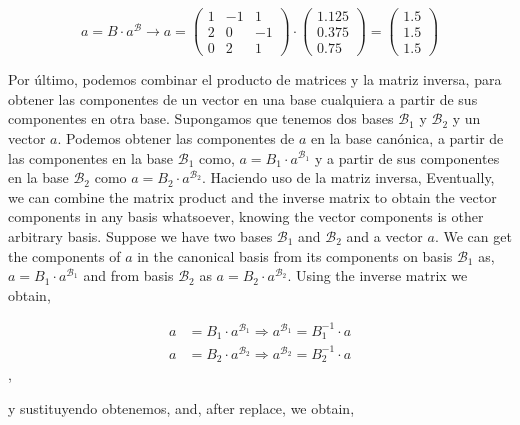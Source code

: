 \begin{equation*}
a=B\cdot a^{\mathcal{B}} \rightarrow a=\begin{pmatrix}
1& -1& 1\\
2& 0& -1\\
0& 2& 1
\end{pmatrix}\cdot \begin{pmatrix}
1.125\\
0.375\\
0.75
\end{pmatrix}
= \begin{pmatrix}
1.5\\
1.5\\
1.5
\end{pmatrix}
\end{equation*}

\begin{paracol}{2}
Por último, podemos combinar el producto de matrices y la matriz inversa, para obtener las componentes de un vector en una base cualquiera a partir de sus componentes en otra base. Supongamos que tenemos dos bases $\mathcal{B}_1$ y $\mathcal{B}_2$ y un vector $a$. Podemos obtener las componentes de $a$ en la base canónica, a partir de las componentes en la base $\mathcal{B}_1$ como, $a=B_1\cdot a^{\mathcal{B}_1}$ y a partir de sus componentes en la base $\mathcal{B}_2$ como $a=B_2\cdot a^{\mathcal{B}_2}$. Haciendo uso de la matriz inversa,
\switchcolumn
Eventually, we can combine the matrix product and the inverse matrix to obtain the vector components in any basis whatsoever, knowing the vector components is other arbitrary basis. Suppose we have two bases $\mathcal{B}_1$ and $\mathcal{B}_2$ and a vector $a$. We can get the components of $a$ in the canonical basis from its components on basis $\mathcal{B}_1$ as, $a=B_1\cdot a^{\mathcal{B}_1}$  and from basis $\mathcal{B}_2$ as $a=B_2\cdot a^{\mathcal{B}_2}$.
Using the inverse matrix we obtain,
\end{paracol}

\begin{align*}
a&=B_1\cdot a^{\mathcal{B}_1} \Rightarrow a^{\mathcal{B}_1}=B_1^{-1} \cdot a \\
 a&=B_2\cdot a^{\mathcal{B}_2} \Rightarrow a^{\mathcal{B}_2}=B_2^{-1} \cdot a
\end{align*},

\begin{paracol}{2}
y sustituyendo obtenemos,
\switchcolumn
and, after replace, we obtain,
\end{paracol}

